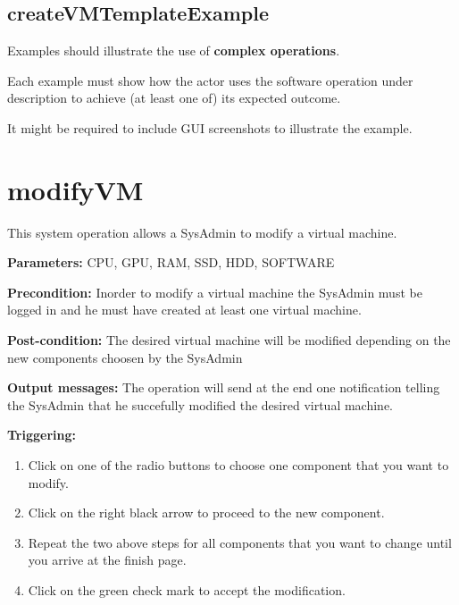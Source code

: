  
\subsection{createVMTemplateExample}
Examples should illustrate the use of \textbf{complex operations}.

Each example must show how the actor uses the software operation under
description to achieve (at least one of) its expected outcome.

It might be required to include GUI screenshots to illustrate the example.














\section{modifyVM}
\label{operation:modifyVM}
This system operation allows a SysAdmin to modify a virtual machine. 
\begin{description}

\item \textbf{Parameters:} CPU, GPU, RAM, SSD, HDD, SOFTWARE
\item \textbf{Precondition:} Inorder to modify a virtual machine the SysAdmin
must be logged in and he must have created at least one virtual machine.
\item \textbf{Post-condition:} The desired virtual machine will be modified
depending on the new components choosen by the SysAdmin
\item \textbf{Output messages:} The operation will send at the end one
notification telling the SysAdmin that he succefully modified the desired
virtual machine.

\item \textbf{Triggering:}
\begin{enumerate}
\item Click on one of the radio buttons to choose one component that you want
to modify.
\item Click on the right black arrow to proceed to the new component.
\item Repeat the two above steps for all components that you want to change
until you arrive at the finish page.
\item Click on the green check mark to accept the modification.
\end{enumerate}

 
\end{description}

